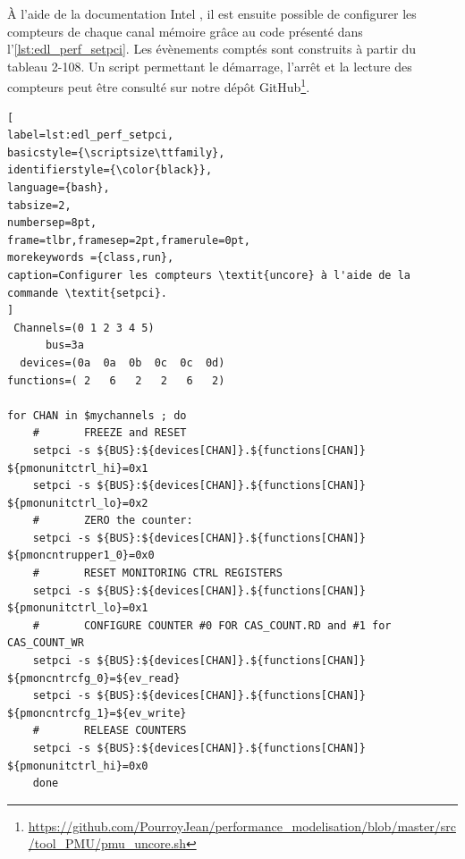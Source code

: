         À l'aide de la documentation Intel \cite{Intel2017b}, il est ensuite possible de configurer les compteurs de chaque canal mémoire grâce au code présenté dans l'\autoref{lst:edl_perf_setpci}. Les évènements comptés sont construits à partir du tableau 2-108. Un script permettant le démarrage, l'arrêt et la lecture des compteurs peut être consulté sur notre dépôt GitHub\footnote{\url{https://github.com/PourroyJean/performance_modelisation/blob/master/src/tool_PMU/pmu_uncore.sh}}. 

\begin{minipage}{\linewidth}
\begin{lstlisting}[
label=lst:edl_perf_setpci,
basicstyle={\scriptsize\ttfamily},
identifierstyle={\color{black}},
language={bash},
tabsize=2,
numbersep=8pt,
frame=tlbr,framesep=2pt,framerule=0pt,
morekeywords ={class,run},
caption=Configurer les compteurs \textit{uncore} à l'aide de la commande \textit{setpci}.
]
 Channels=(0 1 2 3 4 5)
      bus=3a
  devices=(0a  0a  0b  0c  0c  0d)
functions=( 2   6   2   2   6   2)

for CHAN in $mychannels ; do
    #       FREEZE and RESET
    setpci -s ${BUS}:${devices[CHAN]}.${functions[CHAN]} ${pmonunitctrl_hi}=0x1        
    setpci -s ${BUS}:${devices[CHAN]}.${functions[CHAN]} ${pmonunitctrl_lo}=0x2
    #       ZERO the counter:        
    setpci -s ${BUS}:${devices[CHAN]}.${functions[CHAN]} ${pmoncntrupper1_0}=0x0  
    #       RESET MONITORING CTRL REGISTERS        
    setpci -s ${BUS}:${devices[CHAN]}.${functions[CHAN]} ${pmonunitctrl_lo}=0x1
    #       CONFIGURE COUNTER #0 FOR CAS_COUNT.RD and #1 for CAS_COUNT_WR        
    setpci -s ${BUS}:${devices[CHAN]}.${functions[CHAN]} ${pmoncntrcfg_0}=${ev_read}        
    setpci -s ${BUS}:${devices[CHAN]}.${functions[CHAN]} ${pmoncntrcfg_1}=${ev_write}
    #       RELEASE COUNTERS        
    setpci -s ${BUS}:${devices[CHAN]}.${functions[CHAN]} ${pmonunitctrl_hi}=0x0
    done
\end{lstlisting}
\end{minipage}
    

